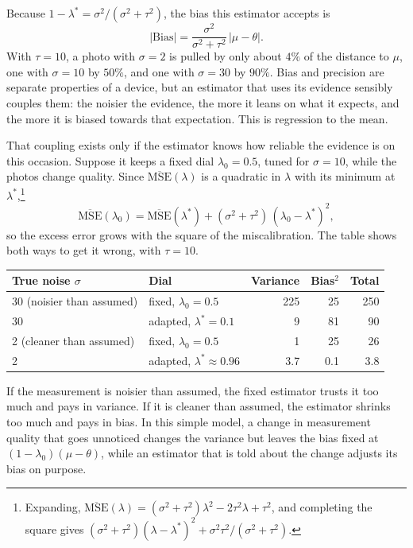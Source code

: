 \documentclass{article}
\begin{document}
Because $1-\lambda^\ast = \sigma^2/(\sigma^2+\tau^2)$, the bias this estimator accepts is
\begin{equation*}
	|\mathrm{Bias}| = \frac{\sigma^2}{\sigma^2+\tau^2}\,|\mu-\theta| .
\end{equation*}
With $\tau = 10$, a photo with $\sigma = 2$ is pulled by only about $4\%$ of the distance to $\mu$, one with $\sigma = 10$ by $50\%$, and one with $\sigma = 30$ by $90\%$. Bias and precision are separate properties of a device, but an estimator that uses its evidence sensibly couples them: the noisier the evidence, the more it leans on what it expects, and the more it is biased towards that expectation. This is regression to the mean.

That coupling exists only if the estimator knows how reliable the evidence is on this occasion. Suppose it keeps a fixed dial $\lambda_0 = 0.5$, tuned for $\sigma = 10$, while the photos change quality. Since $\overline{\mathrm{MSE}}(\lambda)$ is a quadratic in $\lambda$ with its minimum at $\lambda^\ast$,\footnote{
	Expanding, $\overline{\mathrm{MSE}}(\lambda) = (\sigma^2+\tau^2)\lambda^2 - 2\tau^2\lambda + \tau^2$, and completing the square gives $(\sigma^2+\tau^2)(\lambda-\lambda^\ast)^2 + \sigma^2\tau^2/(\sigma^2+\tau^2)$.
}
\begin{equation*}
	\overline{\mathrm{MSE}}(\lambda_0) = \overline{\mathrm{MSE}}(\lambda^\ast)
	+ (\sigma^2+\tau^2)\,(\lambda_0-\lambda^\ast)^2 ,
\end{equation*}
so the excess error grows with the square of the miscalibration. The table shows both ways to get it wrong, with $\tau = 10$.

\begin{center}
	\begin{tabular}{llrrr}
		\hline
		True noise $\sigma$ & Dial & Variance & Bias$^2$ & Total \\
		\hline
		30 (noisier than assumed) & fixed, $\lambda_0 = 0.5$ & 225 & 25 & 250 \\
		30 & adapted, $\lambda^\ast = 0.1$ & 9 & 81 & 90 \\
		\hline
		2 (cleaner than assumed) & fixed, $\lambda_0 = 0.5$ & 1 & 25 & 26 \\
		2 & adapted, $\lambda^\ast \approx 0.96$ & 3.7 & 0.1 & 3.8 \\
		\hline
	\end{tabular}
\end{center}

If the measurement is noisier than assumed, the fixed estimator trusts it too much and pays in variance. If it is cleaner than assumed, the estimator shrinks too much and pays in bias. In this simple model, a change in measurement quality that goes unnoticed changes the variance but leaves the bias fixed at $(1-\lambda_0)(\mu-\theta)$, while an estimator that is told about the change adjusts its bias on purpose.
\end{document}
